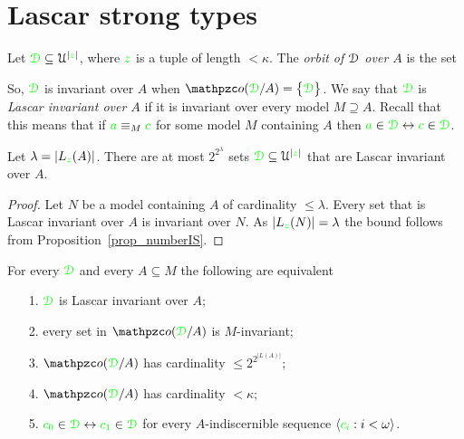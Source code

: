 \documentclass[creche.tex]{subfiles}
\begin{document}
\section{Lascar strong types}
\label{Lst}
\def\equivL{\stackrel{\smash{\scalebox{.5}{\rm L}}}{\equiv}}


Let ${\color{green}\EuScript D}\subseteq\EuScript U^{|{\color{green} z}|}$, where ${\color{green} z}$ is a tuple of length $<\kappa$. The \emph{orbit of $\EuScript D$ over $A$\/} is the set


So, ${\color{green}\EuScript D}$ is invariant over $A$ when $\oorbit(\grD/A)=\big\{\grD\big\}$. We say that ${\color{green}\EuScript D}$ is \emph{Lascar invariant over $A$\/} if it is invariant over every model $M\supseteq A$. Recall that this means that if ${\color{green} a}\equiv_M{\color{green} c}$ for some model $M$ containing $A$ then ${\color{green} a}\in{\color{green}\EuScript D}\leftrightarrow{\color{green}c}\in{\color{green}\EuScript D}$.


\begin{proposition}\label{prop_numero_quasi_invarianti}
  Let $\lambda=|L_{\color{green} z}(A)|$. There are at most $2^{2^{\lambda}}$ sets ${\color{green}\EuScript D}\subseteq\EuScript U^{|{\color{green} z}|}$ that are Lascar invariant over $A$.
\end{proposition}

\begin{proof}
  Let $N$ be a model containing $A$ of cardinality $\le\lambda$. Every set that is Lascar invariant over $A$ is invariant over $N$. As $|L_{\color{green} z}(N)|=\lambda$ the bound follows from Proposition~\ref{prop_numberIS}.
\end{proof}

\begin{theorem}\label{thm_Lascar_indiscernibles}
  For every ${\color{green}\EuScript D}$ and every $A\subseteq M$ the following are equivalent
  \begin{itemize}
    \item[1.] ${\color{green}\EuScript D}$ is Lascar invariant over $A$;
    \item[2.] every set in $\oorbit(\grD/A)$ is $M\mbox{-}$invariant;
    \item[3.] $\oorbit(\grD/A)$ has cardinality $\le 2^{2^{|L(A)|}}$;
    \item[4.] $\oorbit(\grD/A)$ has cardinality $<\kappa$;
    \item[5.] ${\color{green} c_0}\in{\color{green}\EuScript D}\leftrightarrow{\color{green}c_1}\in{\color{green}\EuScript D}$ for every $A\mbox{-}$indiscernible sequence $\langle{\color{green}c_i}:i<\omega\rangle$.
  \end{itemize}
\end{theorem}
\end{document}
